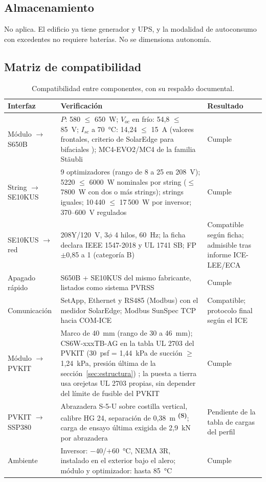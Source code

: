 \documentclass[12pt]{article}
\newcommand{\supuesto}{\textsuperscript{\textcolor{orange!80!black}{\textbf{(S)}}}}
\begin{document}
\subsection{Almacenamiento}
No aplica. El edificio ya tiene generador y UPS, y la modalidad de autoconsumo con excedentes no requiere baterías. No se dimensiona autonomía.

\subsection{Matriz de compatibilidad}
\begin{table}[H]
\centering\small
\caption{Compatibilidad entre componentes, con su respaldo documental.}\label{tab:compat}
\begin{tabularx}{\textwidth}{L{3.2cm}YL{2.0cm}}
\toprule
\textbf{Interfaz} & \textbf{Verificación} & \textbf{Resultado}\\
\midrule
Módulo $\rightarrow$ S650B & $P$: 580 $\leq$ 650~W; $V_{oc}$ en frío: 54,8 $\leq$ 85~V; $I_{sc}$ a 70~°C: 14,24 $\leq$ 15~A (valores frontales, criterio de SolarEdge para bifaciales \cite{seBifacial}); MC4-EVO2/MC4 de la familia Stäubli & Cumple\\
String $\rightarrow$ SE10KUS & 9 optimizadores (rango de 8 a 25 en 208~V); 5220 $\leq$ 6000~W nominales por string ($\leq$ 7800~W con dos o más strings); strings iguales; 10\,440 $\leq$ 17\,500~W por inversor; 370--600~V regulados & Cumple\\
SE10KUS $\rightarrow$ red & 208Y/120~V, 3$\phi$ 4 hilos, 60~Hz; la ficha declara IEEE 1547-2018 y UL 1741 SB; FP $\pm$0,85 a 1 (categoría B) & Compatible según ficha; admisible tras informe ICE-LEE/ECA\\
Apagado rápido & S650B + SE10KUS del mismo fabricante, listados como sistema PVRSS & Cumple\\
Comunicación & SetApp, Ethernet y RS485 (Modbus) con el medidor SolarEdge; Modbus SunSpec TCP hacia COM-ICE \cite{seSunSpec} & Compatible; protocolo final según el ICE\\
Módulo $\rightarrow$ PVKIT & Marco de 40~mm (rango de 30 a 46~mm); CS6W-xxxTB-AG en la tabla UL 2703 del PVKIT (30~psf = 1,44~kPa de succión $\geq$ 1,24~kPa, presión última de la sección~\ref{sec:estructura}) \cite{s5manual}; la puesta a tierra usa orejetas UL 2703 propias, sin depender del límite de fusible del PVKIT & Cumple\\
PVKIT $\rightarrow$ SSP380 & Abrazadera S-5-U sobre costilla vertical, calibre HG 24, separación de 0,38~m \supuesto{}; carga de ensayo última exigida de 2,9~kN por abrazadera & Pendiente de la tabla de cargas del perfil\\
Ambiente & Inversor: $-40$/$+60$~°C, NEMA 3R, instalado en el exterior bajo el alero; módulo y optimizador: hasta 85~°C & Cumple\\
\bottomrule
\end{tabularx}
\end{table}
\end{document}
